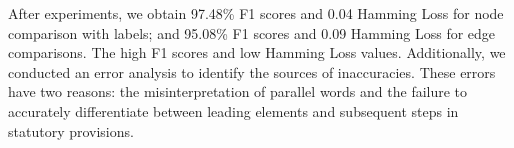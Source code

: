 After experiments, we obtain 97.48\% F1 scores and 0.04 Hamming Loss for node comparison with labels; and 95.08\% F1 scores and 0.09 Hamming Loss for edge comparisons. The high F1 scores and low Hamming Loss values. Additionally, we conducted an error analysis to identify the sources of inaccuracies. These errors have two reasons: the misinterpretation of parallel words and the failure to accurately differentiate between leading elements and subsequent steps in statutory provisions.


